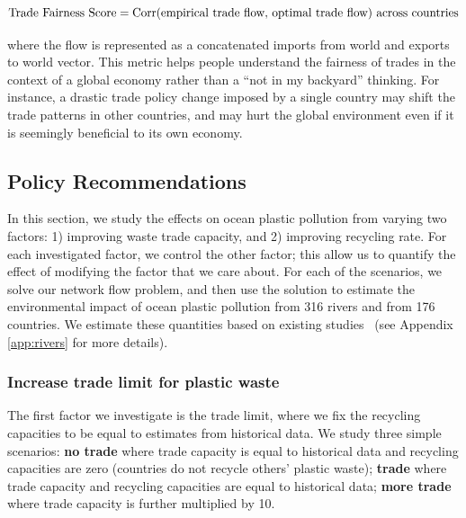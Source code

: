 \documentclass[dvipsnames]{article}
\newcommand{\dl}[1]{{\color{Plum}{{[DL: \bf #1]}}}}
\begin{document}
\begin{equation}
    \textup{Trade Fairness Score} = \textup{Corr(empirical trade flow, optimal trade flow) across countries}
\end{equation}

where the flow is represented as a concatenated imports from world and exports to world vector. This metric helps people understand the fairness of trades in the context of a global economy rather than a ``not in my backyard'' thinking. For instance, a drastic trade policy change imposed by a single country may shift the trade patterns in other countries, and may hurt the global environment even if it is seemingly beneficial to its own economy.


\subsection{Policy Recommendations}

In this section, we study the effects on ocean plastic pollution from varying two factors: 1) improving waste trade capacity, and 2) improving recycling rate. For each investigated factor, we control the other factor; this allow us to quantify the effect of modifying the factor that we care about. For each of the scenarios, we solve our network flow problem, and then use the solution to estimate the environmental impact of ocean plastic pollution from 316 rivers and from 176 countries. We estimate these quantities based on existing studies~\cite{schmidt2017export,peng2021plastic,meijer2021more} (see Appendix \ref{app:rivers} for more details).



\subsubsection{Increase trade limit for plastic waste}
\label{sec:waste-policy}
The first factor we investigate is the trade limit, where we fix the recycling capacities to be equal to estimates from historical data.
We study three simple scenarios: \textbf{no trade} where trade capacity is equal to historical data and recycling capacities are zero (countries do not recycle others' plastic waste); \textbf{trade} where trade capacity and recycling capacities are equal to historical data; \textbf{more trade} where trade capacity is further multiplied by 10. 
\end{document}
